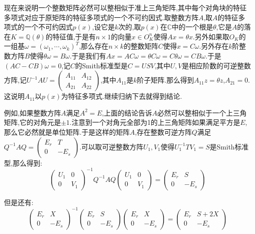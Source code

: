 现在来说明一个整数矩阵必然可以整相似于准上三角矩阵,其中每个对角块的特征多项式对应于原矩阵的特征多项式的一个不可约因式.取整数方阵$A$,取$A$的特征多项式的一个不可约因式$p(x)$,设它是$k$次的,取$p(x)$在$\mathbb{C}$中的一个根是$\theta$,它是$A$的落在$K=\mathbb{Q}(\theta)$的特征值,于是有$n\times 1$的向量$x\in O_K^n$使得$Ax=\theta x$.另外如果取$O_K$的一组基$\omega=(\omega_1,\cdots,\omega_k)^T$,那么存在$n\times k$的整数矩阵$C$使得$x=C\omega$.另外存在$k$阶整数方阵$B$使得$\theta\omega=B\omega$.于是我们有$Ax=AC\omega=\theta C\omega=C\theta\omega=CB\omega$.于是$(AC-CB)\omega=0$,记$C$的Smith标准型是$C=USV$,其中$U,V$是相应阶数的可逆整数方阵,记$U^{-1}AU=\left(\begin{array}{cc}
A_{11}&A_{12}\\
A_{21}&A_{22}\end{array}\right)$,其中$A_{11}$是$k$阶子矩阵.那么得到$A_{11}z=\theta z$,$A_{21}=0$.这说明$A_{11}$以$p(x)$为特征多项式.继续归纳下去就得到结论.

例如,如果整数方阵$A$满足$A^2=E$,上面的结论告诉$A$必然可以整相似于一个上三角矩阵,它的对角元是$\pm1$.注意到一个对角元全部为1的上三角矩阵如果满足平方是$E$,那么它必然就是单位矩阵.于是这样的矩阵$A$,存在整数可逆方阵$Q$满足$Q^{-1}AQ=\left(\begin{array}{cc}
E_r&T\\
0&-E_s\end{array}\right)$.可以取可逆整数方阵$U_1,V_1$使得$U_1^{-1}TV_1=S$是Smith标准型,那么得到:
$$\left(\begin{array}{cc}
U_1&0\\
0&V_1\end{array}\right)^{-1}Q^{-1}AQ\left(\begin{array}{cc}
U_1&0\\
0&V_1\end{array}\right)=\left(\begin{array}{cc}
E_r&S\\
0&-E_s\end{array}\right)$$

但是还有:
$$\left(\begin{array}{cc}
E_r&X\\
0&-E_s\end{array}\right)^{-1}\left(\begin{array}{cc}
E_r&S\\
0&-E_s\end{array}\right)\left(\begin{array}{cc}
E_r&X\\
0&-E_s\end{array}\right)=\left(\begin{array}{cc}
E_r&S+2X\\
0&-E_s\end{array}\right)$$

